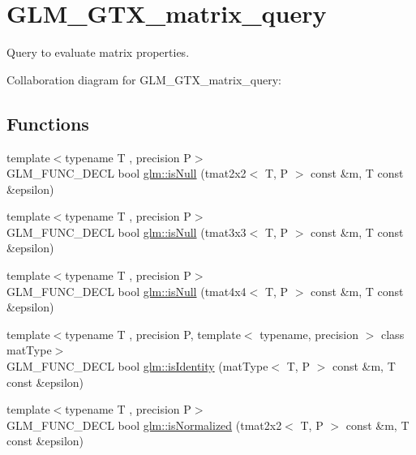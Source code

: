 \hypertarget{group__gtx__matrix__query}{\section{G\-L\-M\-\_\-\-G\-T\-X\-\_\-matrix\-\_\-query}
\label{group__gtx__matrix__query}
}


Query to evaluate matrix properties.  


Collaboration diagram for G\-L\-M\-\_\-\-G\-T\-X\-\_\-matrix\-\_\-query\-:
\subsection*{Functions}
\begin{DoxyCompactItemize}
\item 
{\footnotesize template$<$typename T , precision P$>$ }\\G\-L\-M\-\_\-\-F\-U\-N\-C\-\_\-\-D\-E\-C\-L bool \hyperlink{group__gtx__matrix__query_ga37e535cbeaea383b8c1247b98875cd4b}{glm\-::is\-Null} (tmat2x2$<$ T, P $>$ const \&m, T const \&epsilon)
\item 
{\footnotesize template$<$typename T , precision P$>$ }\\G\-L\-M\-\_\-\-F\-U\-N\-C\-\_\-\-D\-E\-C\-L bool \hyperlink{group__gtx__matrix__query_gac67a5c7e029a84b74b02ac9599b8972d}{glm\-::is\-Null} (tmat3x3$<$ T, P $>$ const \&m, T const \&epsilon)
\item 
{\footnotesize template$<$typename T , precision P$>$ }\\G\-L\-M\-\_\-\-F\-U\-N\-C\-\_\-\-D\-E\-C\-L bool \hyperlink{group__gtx__matrix__query_ga326de496972051413c7b44b85fc9cb6e}{glm\-::is\-Null} (tmat4x4$<$ T, P $>$ const \&m, T const \&epsilon)
\item 
{\footnotesize template$<$typename T , precision P, template$<$ typename, precision $>$ class mat\-Type$>$ }\\G\-L\-M\-\_\-\-F\-U\-N\-C\-\_\-\-D\-E\-C\-L bool \hyperlink{group__gtx__matrix__query_gafc1ce12c738b8c5d007179e615609330}{glm\-::is\-Identity} (mat\-Type$<$ T, P $>$ const \&m, T const \&epsilon)
\item 
{\footnotesize template$<$typename T , precision P$>$ }\\G\-L\-M\-\_\-\-F\-U\-N\-C\-\_\-\-D\-E\-C\-L bool \hyperlink{group__gtx__matrix__query_ga11a8d5cdb36496b85f61e4f5f7f2602c}{glm\-::is\-Normalized} (tmat2x2$<$ T, P $>$ const \&m, T const \&epsilon)
\item 

\end{DoxyCompactItemize}
